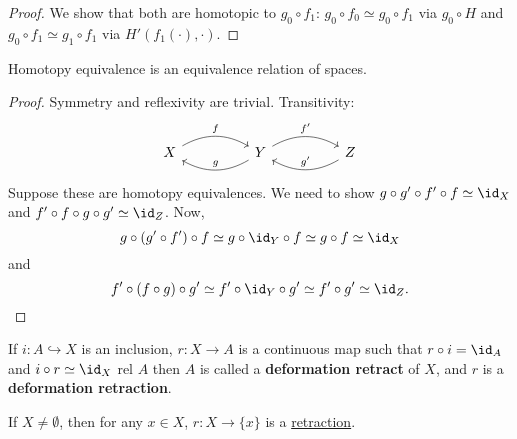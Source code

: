 \documentclass{article}
\numberwithin{nthm}{subsection}
\begin{document}
\begin{proof}
    We show that both are homotopic to $g_0 \circ f_1$:
    $g_0 \circ f_0 \simeq g_0 \circ f_1$ via $g_0 \circ H$ and $g_0 \circ f_1 \simeq g_1 \circ f_1$ via $H'(f_1(\cdot), \cdot).$
\end{proof}

\begin{prop}
    Homotopy equivalence is an equivalence relation of spaces.
\end{prop}

\begin{proof}
    Symmetry and reflexivity are trivial. Transitivity:
    \begin{equation*}
        \begin{tikzcd}[column sep=huge]
            X \rar[bend left,"f"] & Y \rar[bend left,"f'"] \lar[bend left,"g"'] & Z \lar[bend left,"g'"']
        \end{tikzcd}
    \end{equation*}
    Suppose these are homotopy equivalences. We need to show $g \circ g' \circ f' \circ f \simeq \id_X$ and $f' \circ f \circ g \circ g' \simeq \id_Z$.
    Now,
    \begin{equation*}
        g \circ (g' \circ f') \circ f \simeq g \circ \id_Y \circ f \simeq g \circ f \simeq \id_X \\
    \end{equation*}
    and
    \begin{equation*}
        f' \circ (f \circ g) \circ g' \simeq f' \circ \id_Y \circ g' \simeq f' \circ g' \simeq \id_Z. \qedhere
    \end{equation*}
\end{proof}

\begin{defi}
    If $i: A \hookrightarrow X$ is an inclusion, $r: X \to A$ is a continuous map such that $r \circ i = \id_A$ and $i \circ r \simeq \id_X$ rel $A$ then $A$ is called a \textbf{deformation retract} of $X$, and $r$ is a \textbf{deformation retraction}.
\end{defi}


\begin{eg}
    If $X \neq \emptyset$, then for any $x \in X$, $r: X \to \{x\}$ is a \hyperlink{def:retract}{retraction}.
\end{eg}
\end{document}
